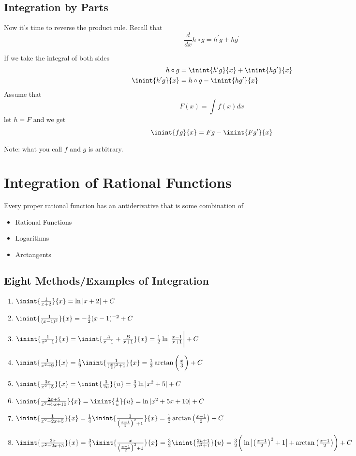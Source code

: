 \documentclass[12pt]{article}
\begin{document}
\subsection*{Integration by Parts}
Now it's time to reverse the product rule. Recall that \[ \frac{d}{dx} h\circ g = h^\prime g + hg^\prime \]

If we take the integral of both sides
\begin{align*}
h\circ g &= \inint{h^\prime g}{x} + \inint{hg^\prime}{x}\\
\inint{h^\prime g}{x} &= h\circ g - \inint{hg^\prime}{x}
\end{align*}
Assume that \[ F(x) = \int\! f(x)dx \] let $h = F$ and we get \[ \inint{fg}{x} = Fg - \inint{Fg^\prime}{x} \]

Note: what you call $f$ and $g$ is arbitrary.

\section*{Integration of Rational Functions}
Every proper rational function has an antiderivative that is some combination of
\begin{itemize}
\item Rational Functions
\item Logarithms
\item Arctangents
\end{itemize}

\subsection*{Eight Methods/Examples of Integration}
\begin{enumerate}
\item $\inint{\frac{1}{x+2}}{x} = \ln|x+2| + C$
\item $\inint{\frac{1}{(x-1)^3}}{x} = -\frac{1}{2}(x-1)^{-2} + C$
\item $\inint{\frac{1}{x^2-1}}{x} = \inint{\frac{A}{x-1}+\frac{B}{x+1}}{x} = \frac{1}{2}\ln\bigg|\frac{x-1}{x+1}\bigg| + C$
\item $\inint{\frac{1}{x^2+9}}{x} = \frac{1}{9}\inint{\frac{1}{(\frac{x}{3})^2+1}}{x} = \frac{1}{3}\arctan\bigg(\frac{x}{3}\bigg) + C$
\item $\inint{\frac{3x}{x^2+5}}{x} = \inint{\frac{3}{2u}}{u} = \frac{3}{2}\ln|x^2+5| + C$
\item $\inint{\frac{2x+5}{x^2+5x+10}}{x} = \inint{\frac{1}{u}}{u} = \ln|x^2+5x+10| + C$
\item $\inint{\frac{1}{x^2-2x+5}}{x} = \frac{1}{4}\inint{\frac{1}{\big(\frac{x-1}{2}\big)^2+1}}{x} = \frac{1}{2}\arctan\big(\frac{x-1}{2}\big) + C$
\item $\inint{\frac{3x}{x^2-2x+5}}{x} = \frac{3}{4}\inint{\frac{x}{\big(\frac{x-1}{2}\big)^2+1}}{x} = \frac{3}{2}\inint{\frac{2u+1}{u^2+1}}{u} = \frac{3}{2}\bigg(\ln\big|\big(\frac{x-1}{2}\big)^2 + 1\big| + \arctan\big(\frac{x-1}{2}\big)\bigg) + C$
\end{enumerate}
\end{document}
